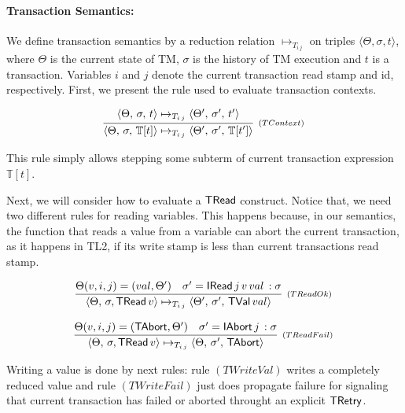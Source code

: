 \documentclass[sigplan]{acmart}
\newcommand{\EvalCtxTran}[1]{\ensuremath{\mathbb{T}[#1]}}
\theoremstyle{definition}
\newcommand{\C}[1]{\red{\mathsf{#1}}}
\begin{document}
\paragraph{Transaction Semantics:}

We define transaction semantics by a reduction relation $\mapsto_{T_{i\,j}}$ on triples
$\langle \Theta, \sigma, t \rangle$, where $\Theta$ is the current state of TM,
$\sigma$ is the history of TM execution and $t$ is a transaction. Variables $i$ and $j$
denote the current transaction read stamp and id, respectively. First, we present
the rule used to evaluate transaction contexts.

\[
  \infer[_{(TContext)}]
        { \langle \Theta,\,\sigma,\,\EvalCtxTran{t}\rangle \mapsto_{T_{i\,j}}
          \langle \Theta',\,\sigma',\,\EvalCtxTran{t'}\rangle }
        { \langle \Theta,\,\sigma,\,t \rangle \mapsto_{T_{i\,j}}
          \langle \Theta',\,\sigma',\, t'\rangle }
\]

This rule simply allows stepping some subterm of current transaction expression $\EvalCtxTran{t}$.

Next, we will consider how to evaluate a \ensuremath{\C{TRead}} construct. Notice that, 
we need two different rules for reading variables. This happens because, in our semantics, the
function that reads a value from a variable can abort the current transaction, as it happens in TL2,
if its write stamp is less than current transactions read stamp.

\[
\begin{array}{c}
  \infer[_{(TReadOk)}]
        { \langle \Theta,\, \sigma, \ensuremath{\C{TRead}}\,v \rangle \mapsto_{T_{i\,j}}
          \langle \Theta',\, \sigma',\,\ensuremath{\C{TVal}}\,val\rangle }
        {\Theta(v,i,j) = (val,\Theta') & \sigma' = \ensuremath{\C{IRead}}\,j\,v\,val\,:\sigma}
  \\
  \\
  \infer[_{(TReadFail)}]
        { \langle \Theta,\, \sigma, \ensuremath{\C{TRead}}\,v \rangle \mapsto_{T_{i\,j}}
          \langle \Theta, \, \sigma',\, \ensuremath{\C{TAbort}} \rangle}
        {\Theta(v,i,j) = (\ensuremath{\C{TAbort}},\Theta') & \sigma' = \ensuremath{\C{IAbort}}\,j\,:\sigma} 
\end{array}
\]

Writing a value is done by next rules: rule $(TWriteVal)$ writes a completely
reduced value and rule $(TWriteFail)$ just does propagate failure for
signaling that current transaction has failed or aborted throught an explicit
\ensuremath{\C{TRetry}}.
\end{document}
